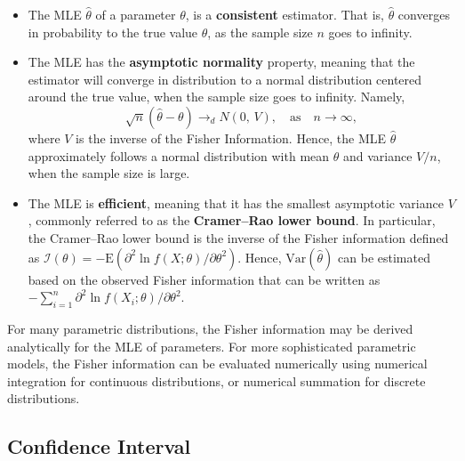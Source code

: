 \documentclass[]{book}
\theoremstyle{definition}
\theoremstyle{definition}
\theoremstyle{definition}
\theoremstyle{remark}
\begin{document}
\begin{itemize}
\item
  The MLE \(\hat{\theta}\) of a parameter \(\theta\), is a
  \textbf{consistent} estimator. That is, \(\hat{\theta}\) converges in
  probability to the true value \(\theta\), as the sample size \(n\)
  goes to infinity.
\item
  The MLE has the \textbf{asymptotic normality} property, meaning that
  the estimator will converge in distribution to a normal distribution
  centered around the true value, when the sample size goes to infinity.
  Namely,
  \[\sqrt{n}(\hat{\theta}-\theta)\rightarrow_d N\left(0,\,V\right),\quad \mbox{as}\quad n\rightarrow \infty,\]
  where \(V\) is the inverse of the Fisher Information. Hence, the MLE
  \(\hat{\theta}\) approximately follows a normal distribution with mean
  \(\theta\) and variance \(V/n\), when the sample size is large.
\item
  The MLE is \textbf{efficient}, meaning that it has the smallest
  asymptotic variance \(V\), commonly referred to as the
  \textbf{Cramer--Rao lower bound}. In particular, the Cramer--Rao lower
  bound is the inverse of the Fisher information defined as
  \(\mathcal{I}(\theta)=-\mathrm{E}(\partial^2\ln f(X;\theta)/\partial \theta^2)\).
  Hence, \(\mathrm{Var}(\hat{\theta})\) can be estimated based on the
  observed Fisher information that can be written as
  \(-\sum_{i=1}^n \partial^2\ln f(X_i;\theta)/\partial \theta^2\).
\end{itemize}

For many parametric distributions, the Fisher information may be derived
analytically for the MLE of parameters. For more sophisticated
parametric models, the Fisher information can be evaluated numerically
using numerical integration for continuous distributions, or numerical
summation for discrete distributions.

\subsection{Confidence Interval}\label{confidence-interval}
\end{document}
